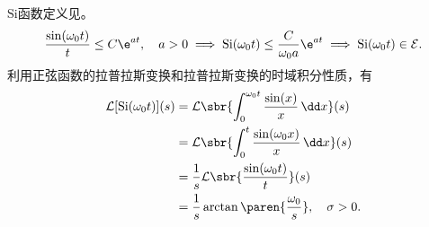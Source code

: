 \begin{example}[正弦积分函数]
    $\mathrm{Si}$函数定义见。
    \begin{equation}
        \frac{\sin(\omega_0 t)}{t}\leq C\e^{at},\quad a>0\implies\mathrm{Si}(\omega_0 t)\leq\frac{C}{\omega_0 a}\e^{at}\implies\mathrm{Si}(\omega_0 t)\in\mathcal{E}.
    \end{equation}
    利用正弦函数的拉普拉斯变换和拉普拉斯变换的时域积分性质，有
    \begin{align}
        \mathcal{L}[\mathrm{Si}(\omega_0 t)](s)&=\mathcal{L}\sbr{\int_0^{\omega_0 t}\frac{\sin(x)}{x}\,\dd x}(s)\nonumber\\
        &=\mathcal{L}\sbr{\int_0^{t}\frac{\sin(\omega_0 x)}{x}\,\dd x}(s)\nonumber\\
        &=\frac{1}{s}\mathcal{L}\sbr{\frac{\sin(\omega_0 t)}{t}}(s)\nonumber\\
        &=\frac{1}{s}\arctan\paren{\frac{\omega_0}{s}},\quad \sigma>0.
    \end{align}
\end{example}


